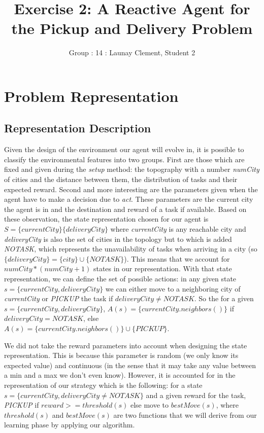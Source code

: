 \documentclass[11pt]{article}
\title{\bf Exercise 2: A Reactive Agent for the Pickup and Delivery Problem}
\author{Group \textnumero: 14 : Launay Clement, Student 2}
\begin{document}
\maketitle

\section{Problem Representation}

\subsection{Representation Description}

Given the design of the environment our agent will evolve in, it is possible to classify the environmental features into two groups.
First are those which are fixed and given during the \textit{setup} method: the topography with a number \textit{numCity} of cities and the distance between them, the distribution of tasks and their expected reward. \newline
Second and more interesting are the parameters given when the agent have to make a decision due to \textit{act}. These parameters are the current city the agent is in and the destination and reward of a task if available. \newline
Based on these observation, the state representation chosen for our agent is $S=\{currentCity\}  \{deliveryCity\}$ where \textit{currentCity} is any reachable city and \textit{deliveryCity} is also the set of cities in the topology but to which is added \textit{NOTASK}, which represents the unavailability of tasks when arriving in a city (so $\{deliveryCity\}=\{city\} \cup \{NOTASK\}$). This means that we account for $numCity*(numCity+1)$ states in our representation.
\newline
With that state representation, we can define the set of possible actions: in any given state $s=\{currentCity,deliveryCity\}$ we can either move to a neighboring city of \textit{currentCity} or \textit{PICKUP} the task if $deliveryCity \neq NOTASK$.
\newline
So the for a given $s=\{currentCity,deliveryCity\}$, $A(s)=\{currentCity.neighbors()\}$ if $deliveryCity = NOTASK$, else $A(s)=\{currentCity.neighbors()\} \cup \{PICKUP\}$. 

We did not take the reward parameters into account when designing the state representation. This is because this parameter is random (we only know its expected value) and continuous (in the sense that it may take any value between a min and a max we don't even know). \newline
However, it is accounted for in the representation of our strategy which is the following: for a state $s=\{currentCity,deliveryCity\neq NOTASK\}$ and a given reward for the task, \textit{PICKUP} if $reward>=threshold(s)$ else move to $bestMove(s)$, where $threshold(s)$ and $bestMove(s)$ are two functions that we will derive from our learning phase by applying our algorithm.
\end{document}
